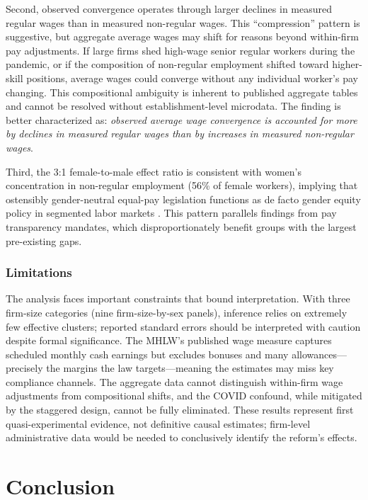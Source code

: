 \documentclass[12pt]{article}
\begin{document}
Second, observed convergence operates through larger declines in measured regular wages than in measured non-regular wages. This ``compression'' pattern is suggestive, but aggregate average wages may shift for reasons beyond within-firm pay adjustments. If large firms shed high-wage senior regular workers during the pandemic, or if the composition of non-regular employment shifted toward higher-skill positions, average wages could converge without any individual worker's pay changing. This compositional ambiguity is inherent to published aggregate tables and cannot be resolved without establishment-level microdata. The finding is better characterized as: \textit{observed average wage convergence is accounted for more by declines in measured regular wages than by increases in measured non-regular wages}.

Third, the 3:1 female-to-male effect ratio is consistent with women's concentration in non-regular employment (56\% of female workers), implying that ostensibly gender-neutral equal-pay legislation functions as de facto gender equity policy in segmented labor markets \citep{baker2023pay, bennedsen2022firms}. This pattern parallels findings from pay transparency mandates, which disproportionately benefit groups with the largest pre-existing gaps.

\subsubsection*{Limitations} The analysis faces important constraints that bound interpretation. With three firm-size categories (nine firm-size-by-sex panels), inference relies on extremely few effective clusters; reported standard errors should be interpreted with caution despite formal significance. The MHLW's published wage measure captures scheduled monthly cash earnings but excludes bonuses and many allowances---precisely the margins the law targets---meaning the estimates may miss key compliance channels. The aggregate data cannot distinguish within-firm wage adjustments from compositional shifts, and the COVID confound, while mitigated by the staggered design, cannot be fully eliminated. These results represent first quasi-experimental evidence, not definitive causal estimates; firm-level administrative data would be needed to conclusively identify the reform's effects.

\section{Conclusion}
\end{document}
